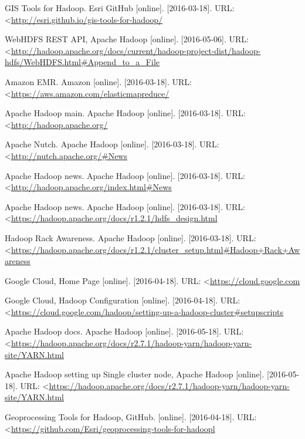 \documentclass[a4paper,12pt,oneside]{report}
\begin{document}
\begin{thebibliography}{99}
		GIS Tools for Hadoop. Esri GitHub [online]. [2016-03-18]. URL: 
		\textless\url{http://esri.github.io/gis-tools-for-hadoop/}
		
		WebHDFS REST API, Apache Hadoop  [online]. [2016-05-06]. URL: 
		\textless\url{http://hadoop.apache.org/docs/current/hadoop-project-dist/hadoop-hdfs/WebHDFS.html#Append_to_a_File
		}
		
		Amazon EMR. Amazon [online]. [2016-03-18]. 
		URL: \textless\url{https://aws.amazon.com/elasticmapreduce/}
		
		Apache Hadoop main. Apache Hadoop [online]. [2016-03-18]. 
		URL: \textless\url{http://hadoop.apache.org/}
		
		Apache Nutch. Apache Hadoop [online]. [2016-03-18]. 
		URL: \textless\url{http://nutch.apache.org/#News
		}
		
		Apache Hadoop news. Apache Hadoop [online]. [2016-03-18]. 
		URL: \textless\url{http://hadoop.apache.org/index.html#News}
		
		
		Apache Hadoop news. Apache Hadoop [online]. [2016-03-18]. 
		URL: \textless\url{https://hadoop.apache.org/docs/r1.2.1/hdfs_design.html}
		
		
		Hadoop Rack Awareness. Apache Hadoop [online]. [2016-03-18]. 
		URL:
		\textless\url{https://hadoop.apache.org/docs/r1.2.1/cluster_setup.html#Hadoop+Rack+Awareness}
		
		Google Cloud, Home Page [online]. [2016-04-18]. 
		URL: \textless\url{https://cloud.google.com}
		
		
		Google Cloud, Hadoop Configuration [online]. [2016-04-18]. 
		URL:
		\textless\url{https://cloud.google.com/hadoop/setting-up-a-hadoop-cluster#setupscripts}
		
		Apache Hadoop docs. Apache Hadoop [online]. [2016-05-18]. 
		URL:
		\textless\url{https://hadoop.apache.org/docs/r2.7.1/hadoop-yarn/hadoop-yarn-site/YARN.html}
		
		Apache Hadoop setting up Single cluster node, Apache Hadoop [online].
		[2016-05-18]. 
		URL:
		\textless\url{https://hadoop.apache.org/docs/r2.7.1/hadoop-yarn/hadoop-yarn-site/YARN.html}
		
		
		Geoprocessing Tools for Hadoop, GitHub. [online]. [2016-04-18]. 
		URL: \textless\url{https://github.com/Esri/geoprocessing-tools-for-hadoopl}
		

\end{thebibliography}
\end{document}
